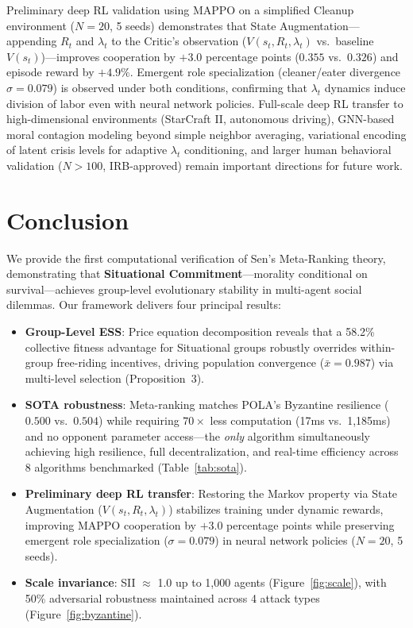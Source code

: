 \documentclass{article}
\begin{document}
Preliminary deep RL validation using MAPPO on a simplified Cleanup environment ($N{=}20$, 5 seeds) demonstrates that State Augmentation---appending $R_t$ and $\lambda_t$ to the Critic's observation ($V(s_t, R_t, \lambda_t)$ vs.\ baseline $V(s_t)$)---improves cooperation by $+3.0$ percentage points ($0.355$ vs.\ $0.326$) and episode reward by $+4.9\%$. Emergent role specialization (cleaner/eater divergence $\sigma{=}0.079$) is observed under both conditions, confirming that $\lambda_t$ dynamics induce division of labor even with neural network policies. Full-scale deep RL transfer to high-dimensional environments (StarCraft II, autonomous driving), GNN-based moral contagion modeling beyond simple neighbor averaging, variational encoding of latent crisis levels for adaptive $\lambda_t$ conditioning, and larger human behavioral validation ($N{>}100$, IRB-approved) remain important directions for future work.

\section{Conclusion}

We provide the first computational verification of Sen's Meta-Ranking theory, demonstrating that \textbf{Situational Commitment}---morality conditional on survival---achieves group-level evolutionary stability in multi-agent social dilemmas. Our framework delivers four principal results:
\begin{itemize}
    \item \textbf{Group-Level ESS}: Price equation decomposition reveals that a 58.2\% collective fitness advantage for Situational groups robustly overrides within-group free-riding incentives, driving population convergence ($\bar{x}=0.987$) via multi-level selection (Proposition~3).
    \item \textbf{SOTA robustness}: Meta-ranking matches POLA's Byzantine resilience ($0.500$ vs.\ $0.504$) while requiring $70{\times}$ less computation (17ms vs.\ 1,185ms) and no opponent parameter access---the \textit{only} algorithm simultaneously achieving high resilience, full decentralization, and real-time efficiency across 8 algorithms benchmarked (Table~\ref{tab:sota}).
    \item \textbf{Preliminary deep RL transfer}: Restoring the Markov property via State Augmentation ($V(s_t, R_t, \lambda_t)$) stabilizes training under dynamic rewards, improving MAPPO cooperation by $+3.0$ percentage points while preserving emergent role specialization ($\sigma{=}0.079$) in neural network policies ($N{=}20$, 5 seeds).
    \item \textbf{Scale invariance}: SII $\approx$ 1.0 up to 1,000 agents (Figure~\ref{fig:scale}), with 50\% adversarial robustness maintained across 4 attack types (Figure~\ref{fig:byzantine}).
\end{itemize}
\end{document}

